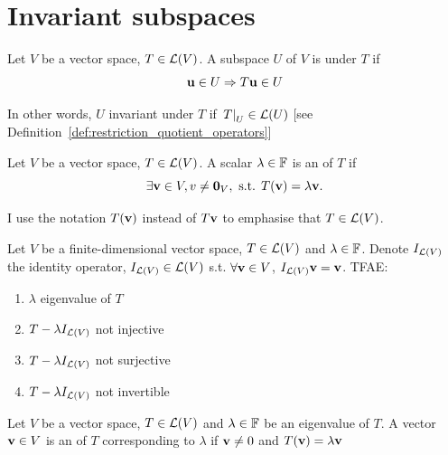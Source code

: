 \documentclass[aspectratio=169]{beamer}
\begin{document}
\section{Invariant subspaces}


\begin{frame}[fragile]
\begin{definition}\label{def:invariant_subspace}
Let $V$ be a vector space, $T\in\mathcal{L}(V)$. A subspace $U$ of $V$ is  under $T$ if
\[
\mathbf{u}\in U\Rightarrow T\mathbf{u}\in U
\]
\end{definition}

In other words, $U$ invariant under $T$ if $\left.T\right|_{U}\in\mathcal{L}(U)$ [see Definition~\ref{def:restriction_quotient_operators}]

\begin{definition}[Eigenvalue]
Let $V$ be a vector space, $T\in\mathcal{L}(V)$. A scalar $\lambda\in\mathbb{F}$ is an  of $T$ if
\[
\exists\bv\in V, v\neq\b0_V,\textrm{ s.t. }T(\bv)=\lambda\bv.
\]
\end{definition}
I use the notation $T(\mathbf{v})$ instead of $T\mathbf{v}$ to emphasise that $T\in\mathcal{L}(V)$.
\end{frame}

\begin{frame}
\begin{theorem}
Let $V$ be a finite-dimensional vector space, $T\in\mathcal{L}(V)$ and $\lambda\in\mathbb{F}$. Denote $I_{\mathcal{L}(V)}$ the identity operator, $I_{\mathcal{L}(V)}\in\mathcal{L}(V)$ s.t. $\forall \mathbf{v}\in V$, $I_{\mathcal{L}(V)}\mathbf{v}=\mathbf{v}$. TFAE:
\begin{enumerate}
\item $\lambda$ eigenvalue of $T$
\item $T-\lambda I_{\mathcal{L}(V)}$ not injective
\item $T-\lambda I_{\mathcal{L}(V)}$ not surjective
\item $T-\lambda I_{\mathcal{L}(V)}$ not invertible
\end{enumerate}
\end{theorem}
\vfill
\begin{definition}[Eigenvector]
Let $V$ be a vector space, $T\in\mathcal{L}(V)$ and $\lambda\in\mathbb{F}$ be an eigenvalue of $T$. A vector $\mathbf{v}\in V$ is an  of $T$ corresponding to $\lambda$ if $\mathbf{v}\neq 0$ and $T(\mathbf{v})=\lambda\mathbf{v}$
\end{definition}
\end{frame}
\end{document}
